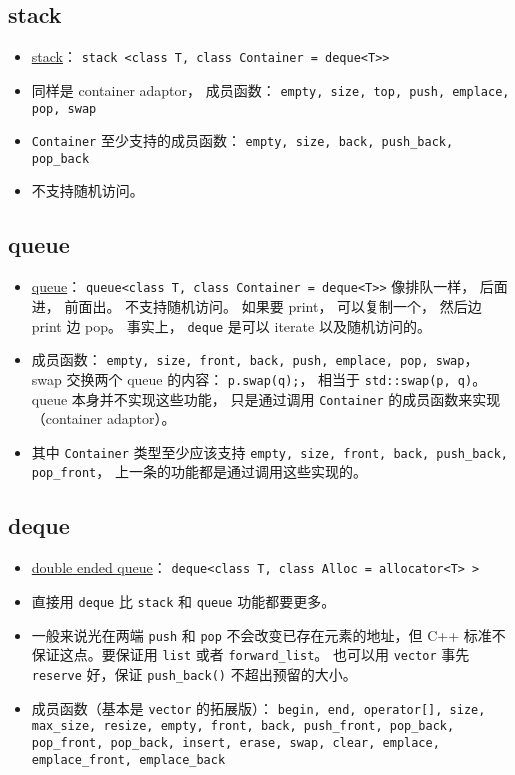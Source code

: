 \subsection{stack}
\begin{itemize}
\item \href{https://cplusplus.com/reference/stack/stack/}{stack}： \verb|stack <class T, class Container = deque<T>>|
\item 同样是 container adaptor， 成员函数： \verb|empty, size, top, push, emplace, pop, swap|
\item \verb|Container| 至少支持的成员函数： \verb|empty, size, back, push_back, pop_back|
\item 不支持随机访问。
\end{itemize}

\subsection{queue}
\begin{itemize}
\item \href{https://cplusplus.com/reference/queue/queue/}{queue}： \verb|queue<class T, class Container = deque<T>>| 像排队一样， 后面进， 前面出。 不支持随机访问。 如果要 print， 可以复制一个， 然后边 print 边 pop。 事实上， \verb|deque| 是可以 iterate 以及随机访问的。
\item 成员函数： \verb|empty, size, front, back, push, emplace, pop, swap|， swap 交换两个 queue 的内容： \verb|p.swap(q);|， 相当于 \verb|std::swap(p, q)|。 queue 本身并不实现这些功能， 只是通过调用 \verb|Container| 的成员函数来实现（container adaptor）。
\item 其中 \verb|Container| 类型至少应该支持 \verb|empty, size, front, back, push_back, pop_front|， 上一条的功能都是通过调用这些实现的。
\end{itemize}

\subsection{deque}
\begin{itemize}
\item \href{https://cplusplus.com/reference/deque/deque/}{double ended queue}： \verb|deque<class T, class Alloc = allocator<T> >|
\item 直接用 \verb|deque| 比 \verb|stack| 和 \verb|queue| 功能都要更多。
\item 一般来说光在两端 \verb`push` 和 \verb`pop` 不会改变已存在元素的地址，但 C++ 标准不保证这点。要保证用 \verb|list| 或者 \verb|forward_list|。 也可以用 \verb|vector| 事先 \verb|reserve| 好，保证 \verb|push_back()| 不超出预留的大小。
\item 成员函数（基本是 \verb|vector| 的拓展版）： \verb|begin, end, operator[], size, max_size, resize, empty, front, back, push_front, pop_back, pop_front, pop_back, insert, erase, swap, clear, emplace, emplace_front, emplace_back|
\end{itemize}

